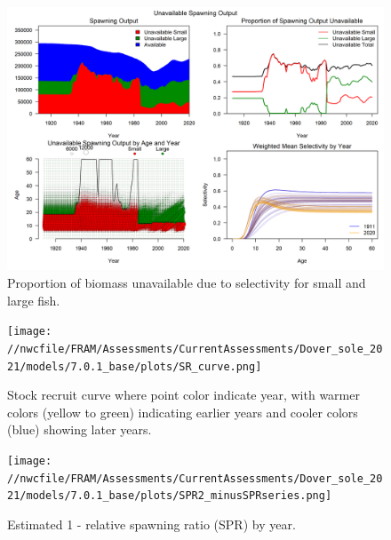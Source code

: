 \documentclass[11pt,
  english,
  a4paper,
]{article}
\begin{document}

\begin{figure}
\centering
\includegraphics[width=1\textwidth,height=1\textheight]{figs/unavailable_biomass.png}
\caption{Proportion of biomass unavailable due to selectivity for small and large fish.\label{fig:unavail-bio}}
\end{figure}

\tagmcend\tagstructend


\begin{figure}
\centering
\texttt{[image: //nwcfile/FRAM/Assessments/CurrentAssessments/Dover\_sole\_2021/models/7.0.1\_base/plots/SR\_curve.png]}
\caption{Stock recruit curve where point color indicate year, with warmer colors (yellow to green) indicating earlier years and cooler colors (blue) showing later years.\label{fig:sr-curve}}
\end{figure}

\tagmcend\tagstructend


\begin{figure}
\centering
\texttt{[image: //nwcfile/FRAM/Assessments/CurrentAssessments/Dover\_sole\_2021/models/7.0.1\_base/plots/SPR2\_minusSPRseries.png]}
\caption{Estimated 1 - relative spawning ratio (SPR) by year.\label{fig:1-spr}}
\end{figure}
\end{document}
